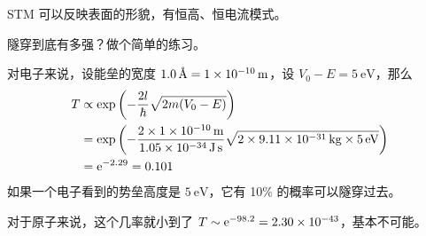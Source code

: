 STM 可以反映表面的形貌，有恒高、恒电流模式。

隧穿到底有多强？做个简单的练习。

对电子来说，设能垒的宽度 $\SI{1.0}{\angstrom} = \SI{1E-10}{\metre}$，设 $V_0 - E = \SI{5}{\electronvolt}$，那么
\begin{align}
    T &\propto \exp\left(-\frac{2l}{\hbar} \sqrt{2m(V_0 - E)}\right) \\
    &= \exp\left(
        - \frac{2\times\SI{1E-10}{\metre}}{\SI{1.05E-34}{\joule\second}}
        \sqrt{2\times\SI{9.11E-31}{\kilo\gram}\times\SI{5}{\electronvolt}}
    \right)
    \\ & = \mathrm{e}^{-2.29} = 0.101
\end{align}
如果一个电子看到的势垒高度是 $\SI{5}{\electronvolt}$，它有 10\% 的概率可以隧穿过去。

对于原子来说，这个几率就小到了 $T\sim \mathrm{e}^{-98.2} = \num{2.30E-43}$，基本不可能。

